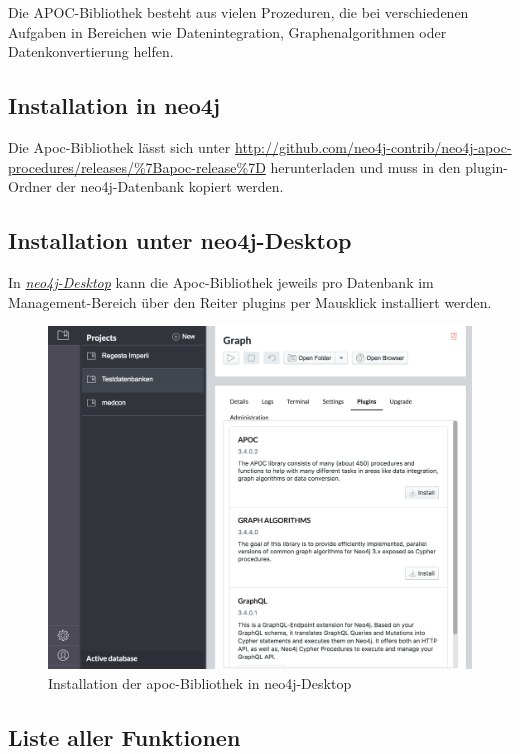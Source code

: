 \documentclass[ngerman,]{scrreprt}
\begin{document}
Die APOC-Bibliothek besteht aus vielen Prozeduren, die bei verschiedenen Aufgaben in Bereichen wie Datenintegration, Graphenalgorithmen oder Datenkonvertierung helfen.

\subsection{Installation in neo4j}\label{installation-in-neo4j}

Die Apoc-Bibliothek lässt sich unter \url{http://github.com/neo4j-contrib/neo4j-apoc-procedures/releases/\%7Bapoc-release\%7D} herunterladen und muss in den plugin-Ordner der neo4j-Datenbank kopiert werden.

\subsection{Installation unter neo4j-Desktop}\label{installation-unter-neo4j-desktop}

In \href{https://neo4j.com/download/}{\emph{neo4j-Desktop}} kann die Apoc-Bibliothek jeweils pro Datenbank im Management-Bereich über den Reiter plugins per Mausklick installiert werden.

\begin{figure}
\centering
\includegraphics{Bilder/cypherFortgeschrittene/neo4j-Desktop-install-apoc.png}
\caption{Installation der apoc-Bibliothek in neo4j-Desktop}
\end{figure}

\subsection{Liste aller Funktionen}\label{liste-aller-funktionen}
\end{document}
